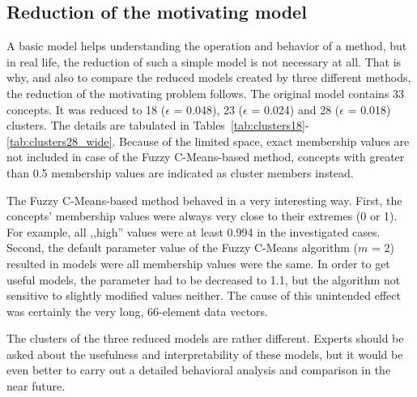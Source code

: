 \documentclass[graybox]{svmult}
\begin{document}
\subsection{Reduction of the motivating model}

A basic model helps understanding the operation and behavior of a 
method, but in real life, the reduction of such a simple model is not 
necessary at all. That is why, and also to compare the reduced models 
created by three different methods, the reduction of the motivating 
problem follows. The original model contains 33 concepts. It was 
reduced to 18 ($\epsilon$ = 0.048), 23 ($\epsilon$ = 0.024) and 28 
($\epsilon$ = 0.018) clusters. The details are tabulated in 
Tables~\ref{tab:clusters18}-\ref{tab:clusters28_wide}. Because of the 
limited space, exact membership values are not included in case of the 
Fuzzy C-Means-based method, concepts with greater than 0.5 
membership values are indicated as cluster members instead.

The Fuzzy C-Means-based method behaved in a very interesting way. 
First, the concepts' membership values were always very close to their 
extremes (0 or 1). For example, all ,,high'' values were at least 0.994 
in the investigated cases. Second, the default parameter value of the 
Fuzzy C-Means algorithm ($m$ = 2) resulted in models were all 
membership values were the same. In order to get useful models, the 
parameter had to be decreased to 1.1, but the algorithm not sensitive 
to slightly modified values neither. The cause of this unintended 
effect was certainly the very long, 66-element data vectors.

The clusters of the three reduced models are rather different. Experts 
should be asked about the usefulness and interpretability of these 
models, but it would be even better to carry out a detailed behavioral 
analysis and comparison in the near future. 
\end{document}
